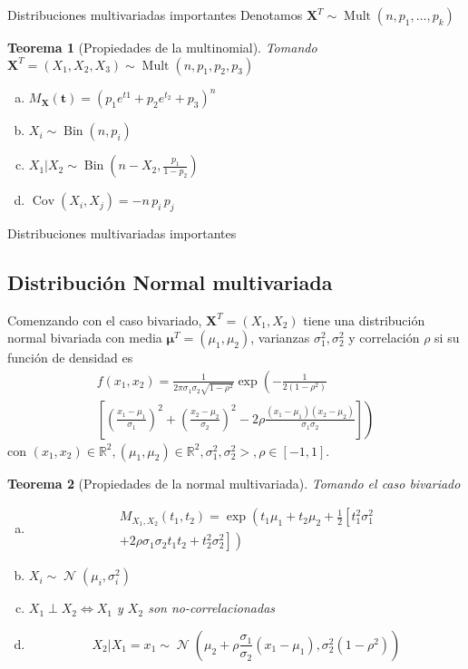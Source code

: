 \documentclass[a4paper]{article}
\theoremstyle{mytheoremstyle}
\newtheorem{theorem}{Teorema}
\newcommand{\R}{\mathbb{R}}
\newcommand{\1}{\mathds{1}}
\DeclareMathOperator{\bin}{Bin}
\DeclareMathOperator{\dnormal}{\mathcal{N}}
\DeclareMathOperator{\cov}{Cov}
\DeclareMathOperator{\mult}{Mult}
\renewcommand{\vec}[1]{\boldsymbol{#1}}
\begin{document}
\begin{multicols*}{3}
\begin{roundbox}{Distribuciones multivariadas importantes}
Denotamos $\vec{X}^{T} \sim \mult(n, p_1, \dots, p_k)$

\begin{theorem}[Propiedades de la multinomial]
    Tomando $\vec{X}^{T} = (X_1, X_2, X_3) \sim \mult(n, p_1, p_2, p_3)$
    \begin{enumerate}[a)]
        \item $M_{\vec{X}}(\vec{t}) = \left( p_1 e^{t1} + p_2 e^{t_2} + p_3 \right)^{n}$
        \item $X_i \sim \bin(n, p_i)$
        \item $X_1 | X_2 \sim \bin\left( n-X_2, \frac{p_1}{1-p_2} \right)$
        \item $\cov(X_i, X_j) = -n \, p_i \, p_j$
    \end{enumerate}
\end{theorem}
\end{roundbox}

\begin{roundbox}{Distribuciones multivariadas importantes}
\subsection*{Distribución Normal multivariada}
Comenzando con el caso bivariado, $\vec{X}^{T} = (X_1, X_2)$ tiene una distribución normal bivariada con media $\vec{\mu}^{T} = (\mu_1, \mu_2)$, varianzas $\sigma_{1}^{2}, \sigma_{2}^{2}$ y correlación $\rho$ si su función de densidad es 
\begin{align*}
    f(x_1,x_2 ) = \frac{1}{2 \pi \sigma_1 \sigma_2 \sqrt{1- \rho^2}} \exp \left( -\frac{1}{2(1-\rho^{2})} \right. \\ \left.  \left[ \left( \frac{x_1 - \mu_1}{\sigma_1} \right)^{2} + \left( \frac{x_2 - \mu_2 }{\sigma_2} \right)^{2} - 2 \rho \frac{(x_1 - \mu_1)(x_2 - \mu_2)}{\sigma_1 \sigma_2} \right] \right)
\end{align*}
con $(x_1, x_2) \in \R^{2}, (\mu_1, \mu_2) \in \R^{2}, \sigma_1^{2}, \sigma_2^{2} > , \rho \in [-1, 1]$.

\begin{theorem}[Propiedades de la normal multivariada]
    Tomando el caso bivariado
    \begin{enumerate}[a)]
        \item \begin{align*} M_{X_1, X_2}(t_1, t_2) = \exp\left( t_1 \mu_1 + t_2 \mu_2 + \frac{1}{2} \left[t_1^2 \sigma_1^{2} \right. \right. \\ \left. \left.  + 2 \rho \sigma_1 \sigma_2 t_1 t_2 + t_2^{2} \sigma_2^{2} \right] \right) \end{align*}
        \item $X_i \sim \dnormal(\mu_i, \sigma_i^{2})$
        \item $X_1 \perp X_2 \iff X_1$ y $X_2$ son no-correlacionadas
        \item \[X_2 | X_1 = x_1 \sim \dnormal\left( \mu_2 + \rho \frac{\sigma_1}{\sigma_2}(x_1 - \mu_1), \sigma_{2}^{2} (1- \rho^{2}) \right)\]
    \end{enumerate}
\end{theorem}


\end{roundbox}
\end{multicols*}
\end{document}
